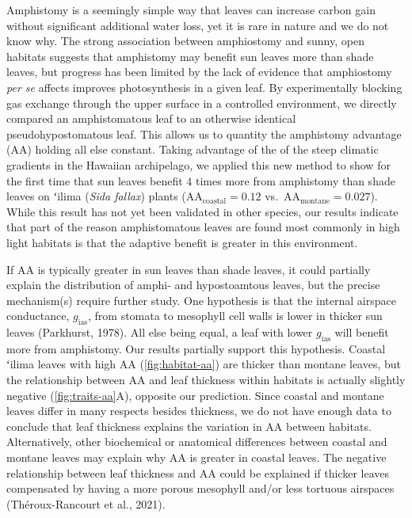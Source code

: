 \documentclass[
  letterpaper,
  DIV=11,
  numbers=noendperiod]{scrartcl}
\begin{document}
Amphistomy is a seemingly simple way that leaves can increase carbon
gain without significant additional water loss, yet it is rare in nature
and we do not know why. The strong association between amphiostomy and
sunny, open habitats suggests that amphistomy may benefit sun leaves
more than shade leaves, but progress has been limited by the lack of
evidence that amphiostomy \emph{per se} affects improves photosynthesis
in a given leaf. By experimentally blocking gas exchange through the
upper surface in a controlled environment, we directly compared an
amphistomatous leaf to an otherwise identical pseudohypostomatous leaf.
This allows us to quantity the amphistomy advantage (\(\mathrm{AA}\))
holding all else constant. Taking advantage of the of the steep climatic
gradients in the Hawaiian archipelago, we applied this new method to
show for the first time that sun leaves benefit 4 times more from
amphistomy than shade leaves on ʻilima (\emph{Sida fallax}) plants
(\(\mathrm{AA}_\text{coastal} = 0.12\)
vs.~\(\mathrm{AA}_\text{montane} = 0.027\)). While this result has not
yet been validated in other species, our results indicate that part of
the reason amphistomatous leaves are found most commonly in high light
habitats is that the adaptive benefit is greater in this environment.

If \(\mathrm{AA}\) is typically greater in sun leaves than shade leaves,
it could partially explain the distribution of amphi- and hypostoamtous
leaves, but the precise mechanism(s) require further study. One
hypothesis is that the internal airspace conductance,
\(g_\mathrm{ias}\), from stomata to mesophyll cell walls is lower in
thicker sun leaves (Parkhurst, 1978). All else being equal, a leaf with
lower \(g_\mathrm{ias}\) will benefit more from amphistomy. Our results
partially support this hypothesis. Coastal ʻilima leaves with high
\(\mathrm{AA}\) (\autoref{fig:habitat-aa}) are thicker than montane
leaves, but the relationship between \(\mathrm{AA}\) and leaf thickness
within habitats is actually slightly negative
(\autoref{fig:traits-aa}A), opposite our prediction. Since coastal and
montane leaves differ in many respects besides thickness, we do not have
enough data to conclude that leaf thickness explains the variation in
\(\mathrm{AA}\) between habitats. Alternatively, other biochemical or
anatomical differences between coastal and montane leaves may explain
why \(\mathrm{AA}\) is greater in coastal leaves. The negative
relationship between leaf thickness and \(\mathrm{AA}\) could be
explained if thicker leaves compensated by having a more porous
mesophyll and/or less tortuous airspaces (Théroux-Rancourt et al.,
2021).
\end{document}
